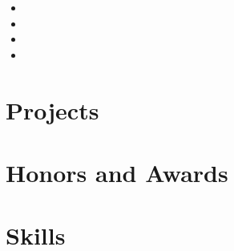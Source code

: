 \documentclass{resume}
\begin{document}
\begin{itemize}[nosep]
  \item  %
  \item  %
  \item  %
  \item  %
\end{itemize}


\section{Projects}






\section{Honors and Awards}

\begin{enumerate}[label={[\arabic*]},nosep]
  \item  %
  \item  %
  \item  %
  \item  %
  \item  %
\end{enumerate}


\section{Skills}


\end{document}
